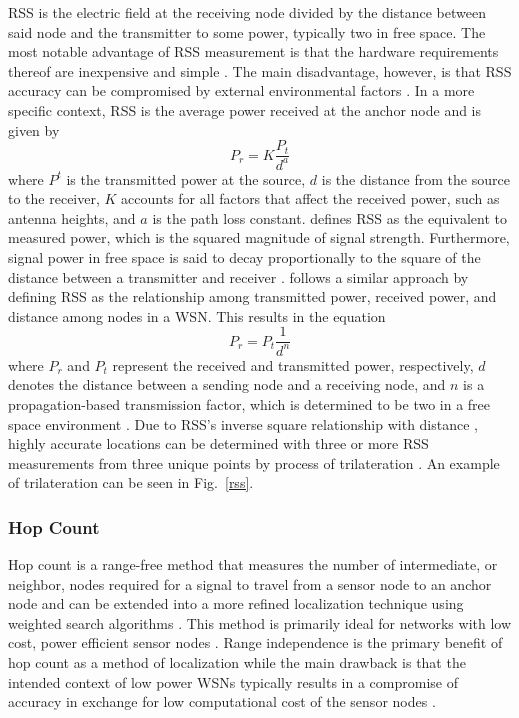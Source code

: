 \documentclass[12pt]{uthesis-v12}  %
\begin{document}
RSS is the electric field at the receiving node divided by the distance between said node and the transmitter to some power, typically two in free space. The most notable advantage of RSS measurement is that the hardware requirements thereof are inexpensive and simple \cite{dapeng}. The main disadvantage, however, is that RSS accuracy can be compromised by external environmental factors \cite{cheng}. In a more specific context, RSS is the average power received at the anchor node and is given by \cite{song}
\begin{equation}
P_{r}=K\frac{P_{t}}{d^{a}}
\label{rss-eq}
\end{equation}
where $P^t$ is the transmitted power at the source, $d$ is the distance from the source to the receiver, $K$ accounts for all factors that affect the received power, such as antenna heights, and $a$ is the path loss constant. \cite{patwari} defines RSS as the equivalent to measured power, which is the squared magnitude of signal strength. Furthermore, signal power in free space is said to decay proportionally to the square of the distance between a transmitter and receiver \cite{patwari}. \cite{xu} follows a similar approach by defining RSS as the relationship among transmitted power, received power, and distance among nodes in a WSN. This results in the equation
\begin{equation}
P_r=P_t\frac{1}{d^n}
\label{pr-eq}
\end{equation}
where $P_r$ and $P_t$ represent the received and transmitted power, respectively, $d$ denotes the distance between a sending node and a receiving node, and $n$ is a propagation-based transmission factor, which is determined to be two in a free space environment \cite{xu}. Due to RSS's inverse square relationship with distance \cite{xu}, highly accurate locations can be determined with three or more RSS measurements from three unique points by process of trilateration \cite{pivato, so, mazuelas}. An example of trilateration can be seen in Fig.~\ref{rss}. 

\subsubsection{Hop Count}

Hop count is a range-free method that measures the number of intermediate, or neighbor, nodes required for a signal to travel from a sensor node to an anchor node \cite{di} and can be extended into a more refined localization technique using weighted search algorithms \cite{yao}. This method is primarily ideal for networks with low cost, power efficient sensor nodes \cite{beyme}. Range independence is the primary benefit of hop count as a method of localization while the main drawback is that the intended context of low power WSNs typically results in a compromise of accuracy in exchange for low computational cost of the sensor nodes \cite{beyme}.
\end{document}
